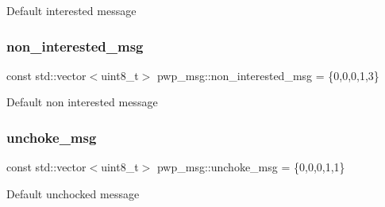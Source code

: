 Default interested message \mbox{\label{namespacepwp__msg_a16a5f22f784d872342a82af9f6b77830}} 
\subsubsection{\texorpdfstring{non\+\_\+interested\+\_\+msg}{non\_interested\_msg}}
{\footnotesize\ttfamily const std\+::vector$<$uint8\+\_\+t$>$ pwp\+\_\+msg\+::non\+\_\+interested\+\_\+msg = \{0,0,0,1,3\}}

Default non interested message \mbox{\label{namespacepwp__msg_acdc5eb698534e84a15db0e061c511e7c}} 
\subsubsection{\texorpdfstring{unchoke\+\_\+msg}{unchoke\_msg}}
{\footnotesize\ttfamily const std\+::vector$<$uint8\+\_\+t$>$ pwp\+\_\+msg\+::unchoke\+\_\+msg = \{0,0,0,1,1\}}

Default unchocked message 